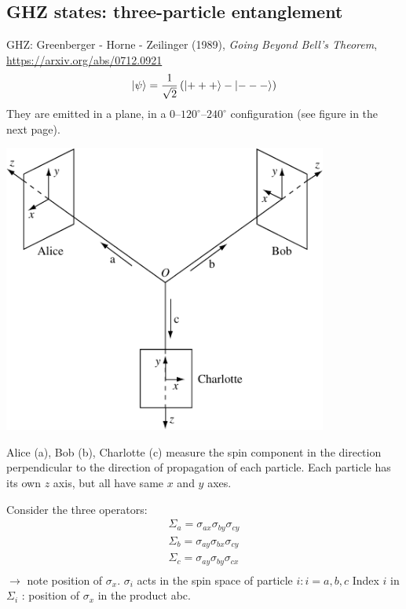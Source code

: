 \documentclass[12pt]{article}
\newcommand{\be}{\begin{equation}}
\newcommand{\ee}{\end{equation}}
\begin{document}
\subsection{GHZ states: three-particle entanglement}

GHZ: Greenberger - Horne - Zeilinger (1989), \emph{Going Beyond Bell's Theorem}, \url{https://arxiv.org/abs/0712.0921}
\be
\ket{\psi} = \frac{1}{\sqrt{2}}
\left(\ket{+++} - \ket{---}\right)
\ee
They are emitted in a plane, in a $0$--$120^\circ$--$240^\circ$ configuration 
(see figure in the next page).
\begin{center}
\includegraphics[width=0.8\textwidth]{Figures/GHZExperiment.pdf}
\end{center}

Alice (a), Bob (b), Charlotte (c) measure the spin component
in the direction perpendicular to the
direction of propagation of each particle.
Each particle
has its own $z$ axis, but all
have same $x$ and $y$ axes.

Consider the three operators:
\be
\begin{aligned}
\Sigma_{a}=\sigma_{a x} \sigma_{b y} \sigma_{c y}\\
\Sigma_{b}=\sigma_{a y} \sigma_{b x} \sigma_{c y}\\
\Sigma_{c}=\sigma_{a y} \sigma_{b y} \sigma_{c x}\\
\end{aligned}
\ee
$\to$ note position of $\sigma_x$.
\(\sigma_{i}\) acts in the spin space of particle \(i: i=a, b, c\)
Index \(i\) in \(\Sigma_{i}\) : position of \(\sigma_{x}\) in the product abc.

\end{document}
